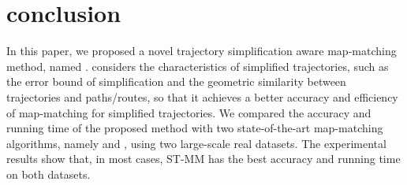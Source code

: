 
\section{conclusion}
\label{sec-conclusion}

In this paper, we proposed a novel trajectory simplification aware map-matching method, named \stmm. \stmm considers the characteristics of simplified
trajectories, such as the error bound of simplification and the geometric similarity between trajectories and paths/routes, so that it achieves a better accuracy and efficiency of map-matching for simplified trajectories.
We compared the accuracy and running time of the proposed method \stmm with two state-of-the-art
map-matching algorithms, namely \hmmbased and \gfbased, using two large-scale real
datasets. The experimental results show that, in most cases, ST-MM has the best accuracy and running time on both datasets.
%

